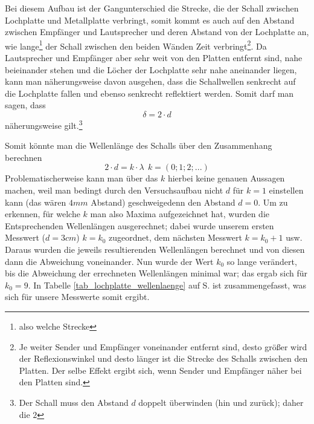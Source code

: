 Bei diesem Aufbau ist der Gangunterschied die Strecke, die der Schall zwischen Lochplatte und Metallplatte verbringt, somit kommt es auch auf den Abstand zwischen Empfänger und Lautsprecher und deren Abstand von der Lochplatte an, wie lange\footnote{also welche Strecke} der Schall zwischen den beiden Wänden Zeit verbringt\footnote{Je weiter Sender und Empfänger voneinander entfernt sind, desto größer wird der Reflexionswinkel und desto länger ist die Strecke des Schalls zwischen den Platten. Der selbe Effekt ergibt sich, wenn Sender und Empfänger näher bei den Platten sind.}. Da Lautsprecher und Empfänger aber sehr weit von den Platten entfernt sind, nahe beieinander stehen und die Löcher der Lochplatte sehr nahe aneinander liegen, kann man näherungsweise davon ausgehen, dass die Schallwellen senkrecht auf die Lochplatte fallen und ebenso senkrecht reflektiert werden. Somit darf man sagen, dass 
\begin{equation}
   \delta = 2 \cdot d
\end{equation}
näherungsweise gilt.\footnote{Der Schall muss den Abstand \(d\) doppelt überwinden (hin und zurück); daher die \(2\)}

Somit könnte man die Wellenlänge des Schalls über den Zusammenhang berechnen
\begin{equation}
  2 \cdot d = k \cdot \lambda ~~ k = (0; 1; 2; ...)
\end{equation}
Problematischerweise kann man über das \(k\) hierbei keine genauen Aussagen machen, weil man bedingt durch den Versuchsaufbau nicht \(d\) für \(k = 1\) einstellen kann (das wären \(4mm\) Abstand) geschweigedenn den Abstand \(d = 0\). Um zu erkennen, für welche \(k\) man also Maxima aufgezeichnet hat, wurden die Entsprechenden Wellenlängen ausgerechnet; dabei wurde unserem ersten Messwert (\(d = 3cm\)) \(k = k_0\) zugeordnet, dem nächsten Messwert \(k = k_0 + 1\) usw. Daraus wurden die jeweils resultierenden Wellenlängen berechnet und von diesen dann die Abweichung voneinander. Nun wurde der Wert \(k_0\) so lange verändert, bis die Abweichung der errechneten Wellenlängen minimal war; das ergab sich für \(k_0 = 9\).  In Tabelle \ref{tab_lochplatte_wellenlaenge} auf S. \pageref{tab_lochplatte_wellenlaenge} ist zusammengefasst, was sich für unsere Messwerte somit ergibt.


